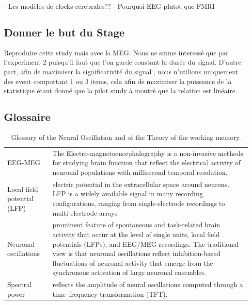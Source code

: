 - Les modèles de clocks cerebrales??
- Pourquoi EEG plutot que FMRI

\subsection{Donner le but du Stage}

Reproduire cette study mais avec la MEG. Nous ne smme interessé que par l'experiment 2 puisqu'il faut que l'on garde constant la durée du signal.
D'autre part, afin de maximiser la significativité du signal , nous n'utilions uniquement des event  comportant 1 ou 3 items, cela afin de maximiser la puissance de la statistique étant donné que la pilot study à montré que la relation est linéaire.

\subsection{Glossaire}

\begin{table}[ht]
    \centering
    \begin{tabular}{@{}| p{4cm}|p{9cm}| @{}}
        \hline
        EEG-MEG                     & The Electro-magnetoencephalography is a non-invasive methods for studying brain function that reflect the electrical activity of neuronal populations with millisecond temporal resolution.                                                                                                                                                             \\

        Local field potential (LFP) & electric potential in the extracellular space around neurons. LFP is a widely available signal in many recording configurations, ranging from single-electrode recordings to multi-electrode arrays                                                                                                                                                     \\
        Neuronal oscillations       & prominent feature of spontaneous and task-related brain activity that occur at the level of single units, local field potentials (LFPs), and EEG/MEG recordings. The traditional view is that neuronal oscillations reflect inhibition-based fluctuations of neuronal activity that emerge from the synchronous activation of large neuronal ensembles. \\
        Spectral power              & reflects the amplitude of neural oscillations computed through a time–frequency transformation (TFT).                                                                                                                                                                                                                                                   \\
        \hline
    \end{tabular}
    \caption{Glossary of the Neural Oscillation and of the Theory of the working memory. \cite{roux2014working}}
    \label{Tab:Glossary_theory}
\end{table}

